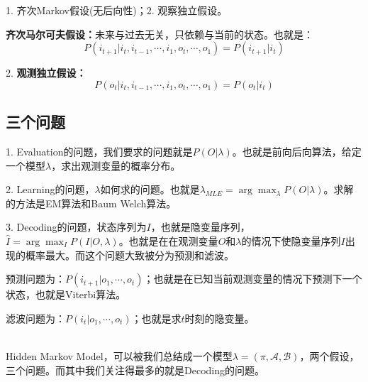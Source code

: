 \documentclass[a4paper]{article}
\begin{document}
1. 齐次Markov假设(无后向性)；2. 观察独立假设。

\textbf{齐次马尔可夫假设：}未来与过去无关，只依赖与当前的状态。也就是：
\begin{equation}
    P(i_{t+1}|i_{t},i_{t-1},\cdots,i_1,o_t,\cdots,o_1) = P(i_{t+1}|i_t)
\end{equation}

2. \textbf{观测独立假设：}
\begin{equation}
    P(o_{t}|i_{t},i_{t-1},\cdots,i_1,o_t,\cdots,o_1) = P(o_{t}|i_t)
\end{equation}

\subsection{三个问题}
1. Evaluation的问题，我们要求的问题就是$P(O|\lambda)$。也就是前向后向算法，给定一个模型$\lambda$，求出观测变量的概率分布。

2. Learning的问题，$\lambda$如何求的问题。也就是$\lambda_{MLE} = \arg\max_{\lambda}P(O|\lambda)$。求解的方法是EM算法和Baum Welch算法。

3. Decoding的问题，状态序列为$I$，也就是隐变量序列，$\hat{I} = \arg\max_{I}P(I|O,\lambda)$。也就是在在观测变量$O$和$\lambda$的情况下使隐变量序列$I$出现的概率最大。而这个问题大致被分为预测和滤波。

预测问题为：$P(i_{t+1}|o_1,\cdots,o_t)$；也就是在已知当前观测变量的情况下预测下一个状态，也就是Viterbi算法。

滤波问题为：$P(i_{t}|o_1,\cdots,o_t)$；也就是求$t$时刻的隐变量。

~\\

Hidden Markov Model，可以被我们总结成一个模型$\lambda = (\pi,\mathcal{A},\mathcal{B})$，两个假设，三个问题。而其中我们关注得最多的就是Decoding的问题。
\end{document}
